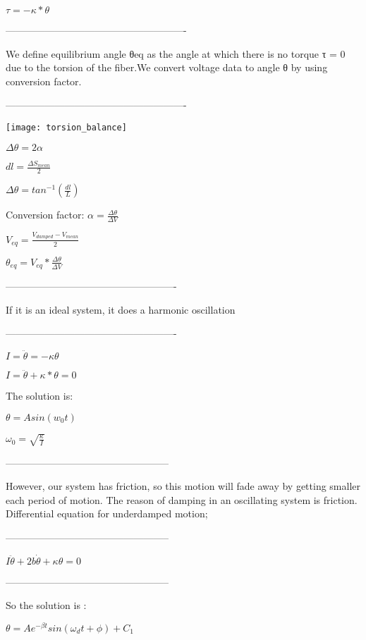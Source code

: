\documentclass[12pt]{article}
\begin{document}
\begin{center}
\par
$\tau = - \kappa * \theta $
\par
-------------------------------------------------------
\par
We define equilibrium angle θeq as the angle at which
there is no torque τ = 0 due to the torsion of the
fiber.We convert voltage data to angle θ by using conversion factor.
\par
-------------------------------------------------------
\par
\texttt{[image: torsion\_balance]}
\par
$\Delta \theta = 2 \alpha$
\par
$dl = \frac{\Delta S_{mean}}{2}$
\par
$\Delta \theta = tan^{-1}(\frac{dl}{L})$
\par
Conversion factor:
$\alpha = \frac{\Delta \theta}{\Delta V}$
\par
$V_{eq} = \frac{V_{damped} - V_{mean}}{2}$
\par
$\theta_{eq} = V_{eq} * \frac{\Delta \theta}{\Delta V}$
\par
----------------------------------------------------
\par
If it is an ideal system, it does a harmonic oscillation
\par
----------------------------------------------------
\par
$I = \ddot{\theta} = - \kappa \theta$
\par
$I = \ddot{\theta} + \kappa * \theta = 0$
\par
The solution is:
\par
$\theta = A sin(w_{0} t)$
\par
$\omega_{0} = \sqrt{\frac{\kappa}{I}}$
\par
--------------------------------------------------
\par
However, our system has friction, so this motion will
fade away by getting smaller each period of motion.
The reason of damping in an oscillating system is friction. Differential equation for underdamped motion;
\par
--------------------------------------------------
\par
$I \ddot{\theta} + 2 b \dot{\theta} + \kappa \theta =0 $
\par
--------------------------------------------------
\par
So the solution is :
\par
$\theta = A e^{- \beta t} sin(\omega_{d}t + \phi) + C_{1}$

\end{center}
\end{document}
